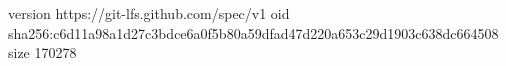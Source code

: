 version https://git-lfs.github.com/spec/v1
oid sha256:c6d11a98a1d27c3bdce6a0f5b80a59dfad47d220a653c29d1903c638dc664508
size 170278
